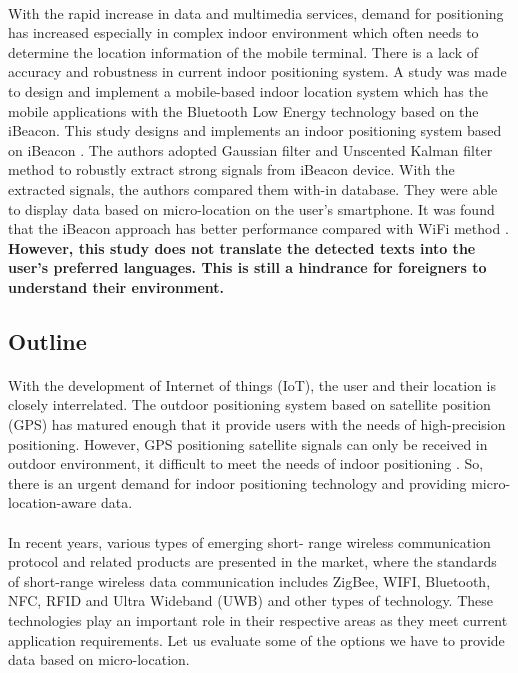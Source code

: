 \documentclass[12pt]{article}
\begin{document}
\paragraph{} With the rapid increase in data and multimedia services, demand for positioning has increased especially in complex indoor environment which often needs to determine the location information of the mobile terminal. There is a lack of accuracy and robustness in current indoor positioning system. A study was made to design and implement a mobile-based indoor location system which has the mobile applications with the Bluetooth Low Energy technology based on the iBeacon. This study designs and implements an indoor positioning system based on iBeacon \cite{indoor}. The authors adopted Gaussian filter and Unscented Kalman filter method to robustly extract strong signals from iBeacon device. With the extracted signals, the authors compared them with-in database. They were able to display data based on micro-location on the user's smartphone.  It was found that the iBeacon approach has better performance compared with WiFi method  \cite{indoor}. \textbf{However, this study does not translate the detected texts into the user's preferred languages. This is still a hindrance for foreigners to understand their environment.}

\subsection{Outline}

\paragraph{}With the development of Internet of things (IoT), the user and their location is closely interrelated. The outdoor positioning system based on satellite position (GPS) has matured enough that it provide users with the needs of high-precision positioning. However, GPS positioning satellite signals can only be received in outdoor environment, it difficult to meet the needs of indoor positioning  \cite{indoor}. So, there is an urgent demand for indoor positioning technology and providing micro-location-aware data. 

\paragraph{}In recent years, various types of emerging short- range wireless communication protocol and related products are presented in the market, where the standards of short-range wireless data communication includes ZigBee, WIFI, Bluetooth, NFC, RFID and Ultra Wideband (UWB) and other types of technology. These technologies play an important role in their respective areas as they meet current application requirements. Let us evaluate some of the options we have to provide data based on micro-location.
\end{document}
